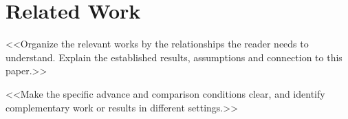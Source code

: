 \section{Related Work}\label{sec:related}
<<Organize the relevant works by the relationships the reader needs to understand.
Explain the established results, assumptions and connection to this paper.>>

<<Make the specific advance and comparison conditions clear, and identify
complementary work or results in different settings.>>
